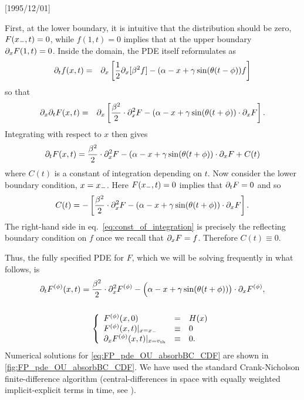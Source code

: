 \NeedsTeXFormat{LaTeX2e}[1995/12/01] \documentclass[10pt]{bmc_article}
\newenvironment{bmcformat}{\begin{raggedright}\baselineskip20pt\sloppy\setboolean{publ}{false}}{\end{raggedright}\baselineskip20pt\sloppy}
\begin{document}
\begin{bmcformat}
First, at the lower boundary, it is intuitive that the distribution should be
zero, $ F({ x_{-} },t) = 0 $, while $f(1,t) = 0$ implies that at the upper boundary
$ {\partial}_xF(1, t) = 0 $. Inside the domain, the PDE itself reformulates as
\begin{eqnarray*}
{\partial}_t f(x,t) &=&  {\partial}_x \left[\frac{1}{2}{\partial}_x [{\beta}^2 f] -  ({\alpha} - x + {\gamma } \sin({\theta}
(t - \phi)) f \right]
\end{eqnarray*}
so that
\begin{eqnarray*}
{\partial}_x {\partial}_t F(x,t) &=& {\partial}_x \left[
\frac{{\beta}^2 }{2}\cdot {\partial}^2_x F -  
						({\alpha}- x + {\gamma } \sin({\theta} (t + \phi))  \cdot {\partial}_xF \right].
\end{eqnarray*}
Integrating with respect to $x$ then gives
$$
{\partial}_t F(x,t) =
\frac{{\beta}^2 }{2}\cdot {\partial}^2_x F -  
						({\alpha}- x + {\gamma } \sin({\theta} (t + \phi))  \cdot {\partial}_xF + C(t)
$$
where $C(t)$ is a constant of integration depending on $t$. Now consider
the lower boundary condition, $x =
{ x_{-} }$. Here $F({ x_{-} },t) = 0$ implies that ${\partial}_tF = 0$ and so 
\begin{equation}
C(t) = - \left[ \frac{{\beta}^2 }{2}\cdot {\partial}^2_x F -  
			({\alpha}- x + {\gamma } \sin({\theta} (t + \phi))  \cdot {\partial}_xF \right].	
\label{eq:const_of_integration}
\end{equation}
The right-hand side in eq.\ \eqref{eq:const_of_integration} is precisely the
reflecting boundary condition on $f$ once we recall that ${\partial}_x F = f$. Therefore $C(t) \equiv 0$.

Thus, the fully specified PDE for $F$, which we will be solving frequently in what
follows, is
\begin{equation}
\begin{gathered}
	{\partial}_t F^{(\phi)}(x,t) =
					\frac{{\beta}^2 }{2}\cdot {\partial}^2_x F^{(\phi)} -  
					\Big({\alpha}- x + {\gamma } \sin({\theta} (t + \phi))\big)  \cdot {\partial}_x F^{(\phi)},
	\\
	\\
	\left\{ \begin{array}{lcl}
	 F^{(\phi)}(x,0) &=& H(x)
	\\
	F^{(\phi)}(x,t) |_{x={ x_{-} }} &\equiv& 0 
	\\
	{\partial}_x F^{(\phi)}(x,t) |_{x={ v_{\textrm{th} } }} &\equiv& 0.
	\end{array} \right.
\label{eq:FP_pde_OU_absorbBC_CDF}
\end{gathered}
\end{equation}
Numerical solutions for \cref{eq:FP_pde_OU_absorbBC_CDF} are shown in
\cref{fig:FP_pde_OU_absorbBC_CDF}. We have used the standard Crank-Nicholson
finite-difference algorithm (central-differences in space with equally weighted
implicit-explicit terms in time, see \cite{Karniadakis2003}). 



\end{bmcformat}
\end{document}
